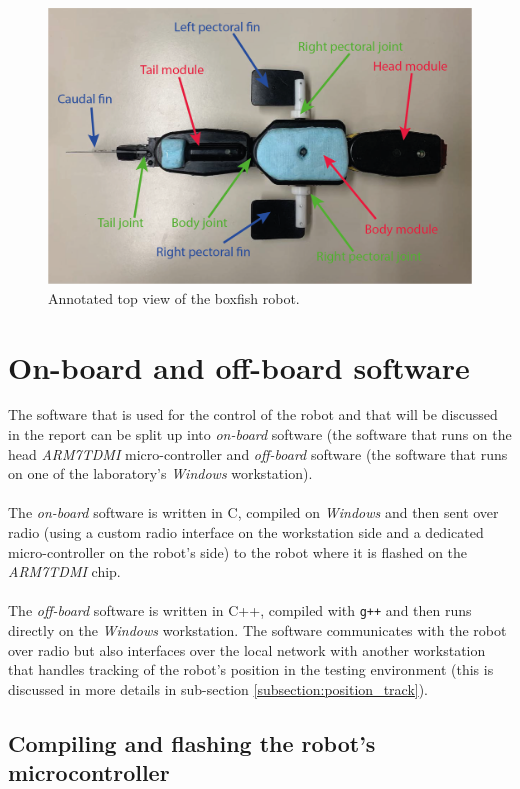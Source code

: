\documentclass[11pt]{article}
\begin{document}
\begin{figure}[h!]
    \centering
    \includegraphics[width=\textwidth]{figures/top_annotated.png}
    \caption{Annotated top view of the boxfish robot.}
    \label{boxfish_labeled}
\end{figure}

\section{On-board and off-board software}

The software that is used for the control of the robot and that will be discussed in the report can be split up into \textit{on-board} software (the software that runs on the head \textit{ARM7TDMI} micro-controller and \textit{off-board} software (the software that runs on one of the laboratory's \textit{Windows} workstation). 
\\ \\
The \textit{on-board} software is written in C, compiled on \textit{Windows} and then sent over radio (using a custom radio interface on the workstation side and a dedicated micro-controller on the robot's side) to the robot where it is flashed on the \textit{ARM7TDMI} chip. 
\\ \\
The \textit{off-board} software is written in C++, compiled with \texttt{g++} and then runs directly on the \textit{Windows} workstation. The  software communicates with the robot over radio but also interfaces over the local network with another workstation that handles tracking of the robot's position in the testing environment (this is discussed in more details in sub-section \ref{subsection:position_track}).
\subsection{Compiling and flashing the robot's microcontroller}
\end{document}
